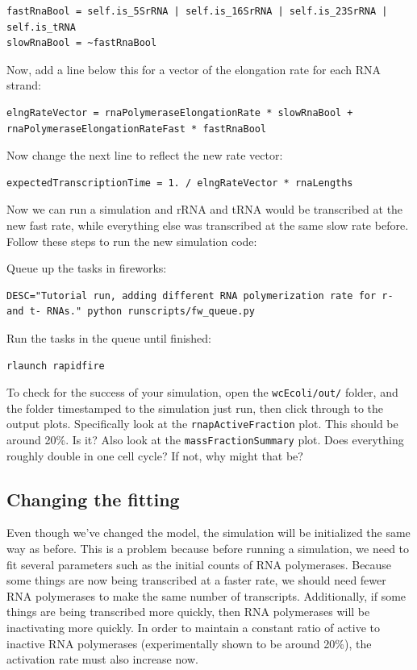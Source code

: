 \documentclass[12pt]{article}
\begin{document}
\begin{lstlisting}
fastRnaBool = self.is_5SrRNA | self.is_16SrRNA | self.is_23SrRNA | self.is_tRNA
slowRnaBool = ~fastRnaBool
\end{lstlisting}

Now, add a line below this for a vector of the elongation rate for each RNA strand:

\begin{lstlisting}
elngRateVector = rnaPolymeraseElongationRate * slowRnaBool +  rnaPolymeraseElongationRateFast * fastRnaBool
\end{lstlisting}

Now change the next line to reflect the new rate vector:

\begin{lstlisting}
expectedTranscriptionTime = 1. / elngRateVector * rnaLengths
\end{lstlisting}

\par
Now we can run a simulation and rRNA and tRNA would be transcribed at the new fast rate, while everything else was transcribed at the same slow rate before. Follow these steps to run the new simulation code:
\par
Queue up the tasks in fireworks:

\lstset{language=bash}
\begin{lstlisting}
DESC="Tutorial run, adding different RNA polymerization rate for r- and t- RNAs." python runscripts/fw_queue.py
\end{lstlisting}

Run the tasks in the queue until finished:

\begin{lstlisting}
rlaunch rapidfire
\end{lstlisting}

To check for the success of your simulation, open the \texttt{wcEcoli/out/} folder, and the folder timestamped to the simulation just run, then click through to the output plots. Specifically look at the \texttt{rnapActiveFraction} plot. This should be around 20\%. Is it? Also look at the \texttt{massFractionSummary} plot. Does everything roughly double in one cell cycle? If not, why might that be?

\subsection{Changing the fitting}

Even though we've changed the model, the simulation will be initialized the same way as before. This is a problem because before running a simulation, we need to fit several parameters such as the initial counts of RNA polymerases. Because some things are now being transcribed at a faster rate, we should need fewer RNA polymerases to make the same number of transcripts. Additionally, if some things are being transcribed more quickly, then RNA polymerases will be inactivating more quickly. In order to maintain a constant ratio of active to inactive RNA polymerases (experimentally shown to be around 20\%), the activation rate must also increase now. 
\end{document}
